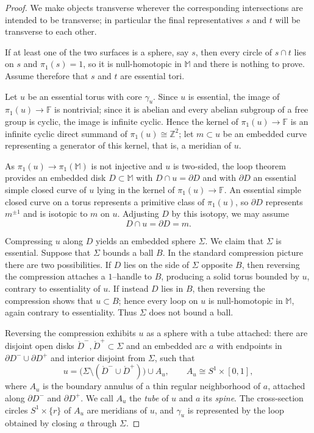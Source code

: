 \documentclass[12pt,a4paper]{amsart}
\numberwithin{equation}{section}
\newcommand{\FF}{\mathbb{F}}
\newcommand{\MM}{\mathbb{M}}
\newcommand{\ZZ}{\mathbb{Z}}
\theoremstyle{plain}
\theoremstyle{definition}
\theoremstyle{remark}
\begin{document}
\begin{proof}
    We make objects transverse wherever the corresponding intersections are intended to be transverse; in particular the final representatives $s$ and $t$ will be transverse to each other.

    If at least one of the two surfaces is a sphere, say $s$, then every circle of $s \cap t$ lies on $s$ and $\pi_1(s) = 1$, so it is null-homotopic in $\MM$ and there is nothing to prove.
    Assume therefore that $s$ and $t$ are essential tori.

    Let $u$ be an essential torus with core $\gamma_u$.
    Since $u$ is essential, the image of $\pi_1(u) \to \FF$ is nontrivial; since it is abelian and every abelian subgroup of a free group is cyclic, the image is infinite cyclic.
    Hence the kernel of $\pi_1(u) \to \FF$ is an infinite cyclic direct summand of $\pi_1(u) \cong \ZZ^2$; let $m \subset u$ be an embedded curve representing a generator of this kernel, that is, a meridian of $u$.

    As $\pi_1(u) \to \pi_1(\MM)$ is not injective and $u$ is two-sided, the loop theorem provides an embedded disk $D \subset \MM$ with $D \cap u = \partial D$ and with $\partial D$ an essential simple closed curve of $u$ lying in the kernel of $\pi_1(u) \to \FF$.
    An essential simple closed curve on a torus represents a primitive class of $\pi_1(u)$, so $\partial D$ represents $m^{\pm 1}$ and is isotopic to $m$ on $u$.
    Adjusting $D$ by this isotopy, we may assume
    \[
        D \cap u = \partial D = m .
    \]

    Compressing $u$ along $D$ yields an embedded sphere $\Sigma$.
    We claim that $\Sigma$ is essential.
    Suppose that $\Sigma$ bounds a ball $B$.
    In the standard compression picture there are two possibilities.
    If $D$ lies on the side of $\Sigma$ opposite $B$, then reversing the compression attaches a $1$--handle to $B$, producing a solid torus bounded by $u$, contrary to essentiality of $u$.
    If instead $D$ lies in $B$, then reversing the compression shows that $u \subset B$; hence every loop on $u$ is null-homotopic in $\MM$, again contrary to essentiality.
    Thus $\Sigma$ does not bound a ball.

    Reversing the compression exhibits $u$ as a sphere with a tube attached: there are disjoint open disks $\mathring{D}^{-}, \mathring{D}^{+} \subset \Sigma$ and an embedded arc $a$ with endpoints in $\partial D^{-} \cup \partial D^{+}$ and interior disjoint from $\Sigma$, such that
    \[
        u = \bigl(\Sigma \setminus (\mathring{D}^{-} \cup \mathring{D}^{+})\bigr) \cup A_u ,
        \qquad A_u \cong S^1 \times [0,1] ,
    \]
    where $A_u$ is the boundary annulus of a thin regular neighborhood of $a$, attached along $\partial D^{-}$ and $\partial D^{+}$.
    We call $A_u$ the \emph{tube} of $u$ and $a$ its \emph{spine}.
    The cross-section circles $S^1 \times \{r\}$ of $A_u$ are meridians of $u$, and $\gamma_u$ is represented by the loop obtained by closing $a$ through $\Sigma$.


\end{proof}
\end{document}
